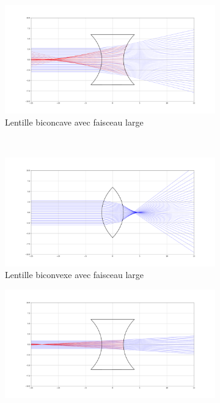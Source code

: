 \documentclass[a4paper, 11pt]{article}
\begin{document}
\begin{figure}[H]
    \centering
    \begin{subfigure}[t]{0.45\linewidth}
    	\centering
		\includegraphics[width=\linewidth]{Figures/Figures_lentilles/biconcave_pastig.pdf}
		\caption{Lentille biconcave avec faisceau large}
		\label{fig:conc_pastig} 
    \end{subfigure}
    ~
    \begin{subfigure}[t]{0.45\linewidth}
    	\centering
		\includegraphics[width=\linewidth]{Figures/Figures_lentilles/biconvexe_pastig.pdf}
		\caption{Lentille biconvexe avec faisceau large}
		\label{fig:conv_pastig} 
    \end{subfigure}
\hfill
    \begin{subfigure}[t]{0.45\linewidth}
    	\centering
		\includegraphics[width=\linewidth]{Figures/Figures_lentilles/biconcave_stig.pdf}

\end{subfigure}
\end{figure}
\end{document}
